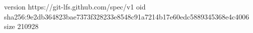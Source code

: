version https://git-lfs.github.com/spec/v1
oid sha256:9e2db364823bae7373f328233e8548c91a7214b17e60edc5889345368e4c4006
size 210928
